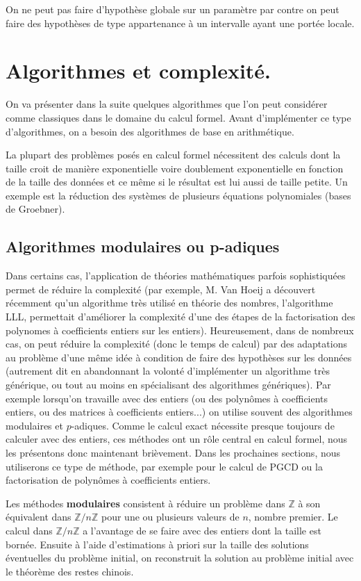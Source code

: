 \documentclass[a4paper,11pt]{book}
\begin{document}
\begin{giacjshere}
On ne peut pas faire d'hypothèse globale sur un paramètre par
contre on peut faire des hypothèses de type appartenance à un intervalle 
ayant une portée locale.

\section{Algorithmes et complexité.}
On va présenter dans la suite quelques algorithmes que l'on peut
considérer comme classiques dans le domaine du calcul formel. Avant 
d'implémenter ce type d'algorithmes, on a besoin des algorithmes de base
en arithmétique. 

La plupart des problèmes posés en calcul formel nécessitent des
calculs dont la taille croit de manière exponentielle voire
doublement exponentielle en fonction de la taille des données et
ce même si le résultat est lui aussi de taille petite. Un
exemple est la réduction des systèmes de plusieurs équations polynomiales
(bases de Groebner).

\subsection{Algorithmes modulaires ou p-adiques}
Dans certains cas, l'application de théories mathématiques
parfois sophistiquées permet de réduire la complexité (par exemple,
M. Van Hoeij a découvert récemment qu'un algorithme très utilisé en théorie des
nombres, l'algorithme LLL, permettait d'améliorer la complexité d'une des
étapes de la factorisation des polynomes à coefficients entiers sur les
entiers). Heureusement, dans de nombreux cas, on peut r\'eduire la
complexit\'e (donc le temps de calcul) par des adaptations au
probl\`eme d'une m\^eme id\'ee \`a condition de faire des
hypoth\`eses sur les donn\'ees (autrement dit en abandonnant la volont\'e
d'impl\'ementer un algorithme tr\`es g\'en\'erique, ou tout au moins
en sp\'ecialisant des algorithmes g\'en\'eriques).
 Par exemple lorsqu'on travaille
avec des entiers (ou des polyn\^omes \`a coefficients entiers, ou
des matrices \`a coefficients entiers...) on utilise souvent des algorithmes
modulaires et $p$-adiques. Comme le calcul exact n\'ecessite
presque toujours de calculer avec des entiers, ces m\'ethodes
ont un r\^ole central en calcul formel, nous les pr\'esentons donc
maintenant bri\`evement. Dans les prochaines sections, nous utiliserons
ce type de m\'ethode, par exemple pour le calcul de PGCD ou la factorisation
de polyn\^omes \`a coefficients entiers.

Les m\'ethodes {\bf modulaires} consistent \`a r\'eduire un probl\`eme dans 
$\mathbb{Z}$ \`a son \'equivalent dans $\mathbb{Z}/n\mathbb{Z}$ pour une ou 
plusieurs valeurs de $n$, nombre premier. Le calcul dans $\mathbb{Z}/n\mathbb{Z}$
a l'avantage de se faire avec des entiers dont la taille est bornée.
Ensuite \`a l'aide d'estimations 
\`a priori sur la taille des solutions 
\'eventuelles du probl\`eme initial, on reconstruit la solution au problème
initial avec le th\'eor\`eme des restes chinois. 


\end{giacjshere}
\end{document}
